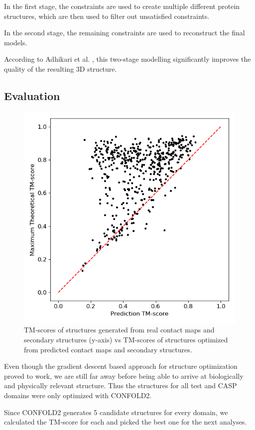 In the first stage, the constraints are used to create multiple different protein structures, which are then used to filter out unsatisfied constraints.

In the second stage, the remaining constraints are used to reconstruct the final models.

According to Adhikari et al. \cite{confold}, this two-stage modelling significantly improves the quality of the resulting 3D structure.

\subsection{Evaluation}

\begin{figure}
    \centering
    \includegraphics[width=0.6\linewidth]{imgs_tomas/test_tmscore.png}
    \caption{TM-scores of structures generated from real contact maps and secondary structures (y-axis) vs TM-scores of structures optimized from predicted contact maps and secondary structures.}
    \label{fig:test_tmscore}
\end{figure}

Even though the gradient descent based approach for structure optimization proved to work, we are still far away before being able to arrive at biologically and physically relevant structure. Thus the structures for all test and CASP domains were only optimized with CONFOLD2. 

Since CONFOLD2 generates 5 candidate structures for every domain, we calculated the TM-score for each and picked the best one for the next analyses.

